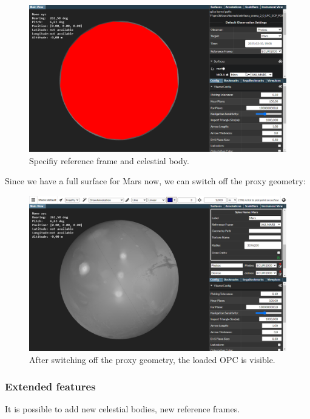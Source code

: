 \begin{figure}[h!]
	\centering
	\includegraphics[width=1\textwidth]{pics/surfaceRefFrame.png}
	\caption{Specifiy reference frame and celestial body.}
\end{figure}

Since we have a full surface for Mars now, we can switch off the proxy
geometry:

\begin{figure}[h!]
	\centering
	\includegraphics[width=1\textwidth]{pics/molaObservation.png}
	\caption{After switching off the proxy geometry, the loaded OPC is visible.}
\end{figure}

\newpage

\hypertarget{extended-features}{%
	\subsubsection{Extended features}\label{extended-features}}

It is possible to add new celestial bodies, new reference frames.


